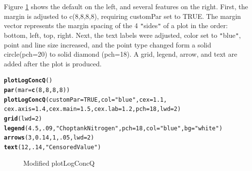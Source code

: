 \documentclass[a4paper,11pt]{article}\usepackage{graphicx, color}
\makeatletter
\newcommand{\hlfunctioncall}[1]{\textcolor[rgb]{0.501960784313725,0,0.329411764705882}{\textbf{#1}}}%
\newcommand{\hlstring}[1]{\textcolor[rgb]{0.6,0.6,1}{#1}}%
\newenvironment{kframe}{%
 \def\at@end@of@kframe{}%
 \ifinner\ifhmode%
  \def\at@end@of@kframe{\end{minipage}}%
  \begin{minipage}{\columnwidth}%
 \fi\fi%
 \def\FrameCommand##1{\hskip\@totalleftmargin \hskip-\fboxsep
 \colorbox{shadecolor}{##1}\hskip-\fboxsep
     \hskip-\linewidth \hskip-\@totalleftmargin \hskip\columnwidth}%
 \MakeFramed {\advance\hsize-\width
   \@totalleftmargin\z@ \linewidth\hsize
   \@setminipage}}%
 {\par\unskip\endMakeFramed%
 \at@end@of@kframe}
\newenvironment{knitrout}{}{} %
\makeatother
\begin{document}
Figure \ref{fig:plotLogConcQComparison} shows the default on the left, and several features on the right. First, the margin is adjusted to c(8,8,8,8), requiring customPar set to TRUE. The margin vector represents the margin spacing of the 4 \texttt{"}sides\texttt{"} of a plot in the order: bottom, left, top, right. Next, the text labels were adjusted, color set to \texttt{"}blue\texttt{"}, point and line size increased, and the point type changed form a solid circle(pch=20) to solid diamond (pch=18). A grid, legend, arrow, and text are added after the plot is produced.
\begin{knitrout}
\color{fgcolor}\begin{kframe}
\begin{alltt}
\hlfunctioncall{plotLogConcQ}()
\hlfunctioncall{par}(mar=\hlfunctioncall{c}(8,8,8,8))
\hlfunctioncall{plotLogConcQ}(customPar=TRUE,col=\hlstring{"blue"},cex=1.1,
             cex.axis=1.4,cex.main=1.5,cex.lab=1.2,pch=18,lwd=2)
\hlfunctioncall{grid}(lwd=2)
\hlfunctioncall{legend}(4.5,.09,\hlstring{"Choptank Nitrogen"}, pch=18, col=\hlstring{"blue"},bg=\hlstring{"white"})
\hlfunctioncall{arrows}(3, 0.14, 1, .05,lwd=2)
\hlfunctioncall{text}(12,.14,\hlstring{"Censored Value"})
\end{alltt}
\end{kframe}\begin{figure}[]
\caption[Modified plotLogConcQ]{Modified plotLogConcQ\label{fig:plotLogConcQComparison}}
\end{figure}


\end{knitrout}
\end{document}
